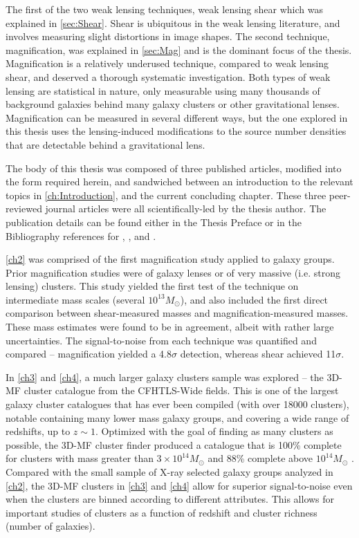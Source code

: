 The first of the two weak lensing techniques, weak lensing shear which was explained in \autoref{sec:Shear}. Shear is ubiquitous in the weak lensing literature, and involves measuring slight distortions in image shapes. The second technique, magnification, was explained in \autoref{sec:Mag} and is the dominant focus of the thesis. Magnification is a relatively underused technique, compared to weak lensing shear, and deserved a thorough systematic investigation. Both types of weak lensing are statistical in nature, only measurable using many thousands of background galaxies behind many galaxy clusters or other gravitational lenses.  Magnification can be measured in several different ways, but the one explored in this thesis uses the lensing-induced modifications to the source number densities that are detectable behind a gravitational lens.

The body of this thesis was composed of three published articles, modified into the form required herein, and sandwiched between an introduction to the relevant topics in \autoref{ch:Introduction}, and the current concluding chapter. These three peer-reviewed journal articles were all scientifically-led by the thesis author. The publication details can be found either in the Thesis Preface or in the Bibliography references for \citet{Ford12}, \citet{Ford14}, and \citet{Ford15}. 

\autoref{ch2} was comprised of the first magnification study applied to galaxy groups. Prior magnification studies were of galaxy lenses or of very massive (i.e. strong lensing) clusters. This study yielded the first test of the technique on intermediate mass scales (several $10^{13} M_{\odot}$), and also included the first direct comparison between shear-measured masses and magnification-measured masses. These mass estimates were found to be in agreement, albeit with rather large uncertainties. The signal-to-noise from each technique was quantified and compared -- magnification yielded a 4.8$\sigma$ detection, whereas shear achieved 11$\sigma$.

In \autoref{ch3} and \autoref{ch4}, a much larger galaxy clusters sample was explored -- the \ac{3D-MF} cluster catalogue from the \ac{CFHTLS}-Wide fields. This is one of the largest galaxy cluster catalogues that has ever been compiled (with over 18000 clusters), notable containing many lower mass galaxy groups, and covering a wide range of redshifts, up to $z \sim 1$. Optimized with the goal of finding as many clusters as possible, the \ac{3D-MF} cluster finder produced a catalogue that is 100\% complete for clusters with mass greater than $3 \times 10^{14} M_{\odot}$ and 88\% complete above $10^{14} M_{\odot}$ \citep[see \autoref{3DMF} or the original \ac{3D-MF} paper][for more details]{Milkeraitis10}. Compared with the small sample of X-ray selected galaxy groups analyzed in \autoref{ch2}, the \ac{3D-MF} clusters in \autoref{ch3} and \autoref{ch4} allow for superior signal-to-noise even when the clusters are binned according to different attributes. This allows for important studies of clusters as a function of redshift and cluster richness (number of galaxies).

